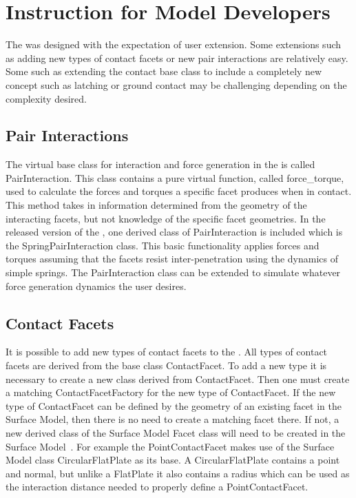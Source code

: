 \section{Instruction for Model Developers}
The \ModelDesc was designed with the expectation of user extension.  Some extensions such as adding new types of contact facets or new pair interactions are relatively easy. Some such as extending the contact base class to include a completely new concept such as latching or ground contact may be challenging depending on the complexity desired.
\subsection{Pair Interactions}
The virtual base class for interaction and force generation in the \ModelDesc is called PairInteraction.  This class contains a pure virtual function, called force\_torque, used to calculate the forces and torques a specific facet produces when in contact.  This method takes in information determined from the geometry of the interacting facets, but not knowledge of the specific facet geometries.  In the released version of the \ModelDesc, one derived class of PairInteraction is included which is the SpringPairInteraction class.  This basic functionality applies forces and torques assuming that the facets resist inter-penetration using the dynamics of simple springs.  The PairInteraction class can be extended to simulate whatever force generation dynamics the user desires.

\subsection{Contact Facets}
It is possible to add new types of contact facets to the \ModelDesc.  All types of contact facets are derived from the base class ContactFacet.  To add a new type it is necessary to create a new class derived from ContactFacet.  Then one must create a matching ContactFacetFactory for the new type of ContactFacet.  If the new type of ContactFacet can be defined by the geometry of an existing facet in the Surface Model, then there is no need to create a matching facet there.  If not, a new derived class of the Surface Model Facet class will need to be created in the Surface Model~\cite{dynenv:SURFACEMODEL}. For example the PointContactFacet makes use of the Surface Model class CircularFlatPlate as its base.  A CircularFlatPlate contains a point and normal, but unlike a FlatPlate it also contains a radius which can be used as the interaction distance needed to properly define a PointContactFacet.

